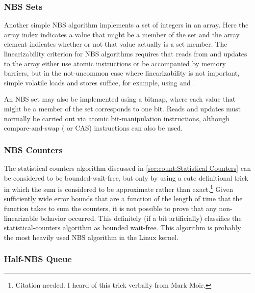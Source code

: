\subsubsection{NBS Sets}
\label{sec:advsync:NBS Sets}

Another simple NBS algorithm implements a set of integers in an array.
Here the array index indicates a value that might be a member of the set
and the array element indicates whether or not that value actually is
a set member.
The linearizability criterion for NBS algorithms requires that reads from
and updates to the array either use atomic instructions or be accompanied
by memory barriers, but in the not-uncommon case where linearizability
is not important, simple volatile loads and stores suffice, for example,
using  and .

An NBS set may also be implemented using a bitmap, where each value that
might be a member of the set corresponds to one bit.
Reads and updates must normally be carried out via atomic bit-manipulation
instructions, although compare-and-swap ( or CAS)
instructions can also be used.

\subsubsection{NBS Counters}
\label{sec:advsync:NBS Counters}

The statistical counters algorithm discussed in
\cref{sec:count:Statistical Counters}
can be considered to be bounded-wait-free, but only by using a cute
definitional trick in which the sum is considered to be approximate
rather than exact.\footnote{
	Citation needed.
	I heard of this trick verbally from Mark Moir.}
Given sufficiently wide error bounds that are a function of the length
of time that the  function takes to sum the counters,
it is not possible to prove that any non-linearizable behavior occurred.
This definitely (if a bit artificially) classifies the statistical-counters
algorithm as bounded wait-free.
This algorithm is probably the most heavily used NBS algorithm in the
Linux kernel.

\subsubsection{Half-NBS Queue}
\label{sec:advsync:Half-NBS Queue}

